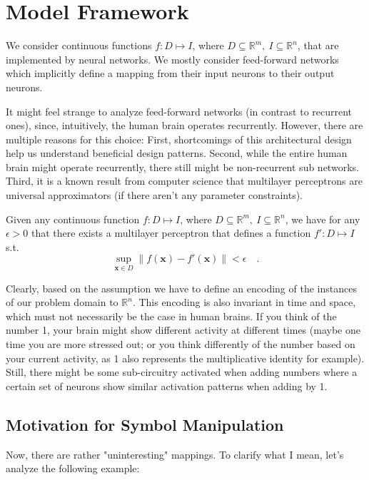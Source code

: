 \documentclass[../../main.tex]{subfiles}
\begin{document}
    \section{Model Framework}
    We consider continuous functions $f: D \mapsto I$, where $D \subseteq \mathbb{R}^m , \ I \subseteq \mathbb{R}^n$, that are implemented by neural networks. We mostly consider feed-forward networks which implicitly define a mapping from their input neurons to their output neurons.

    It might feel strange to analyze feed-forward networks (in contrast to recurrent ones), since, intuitively, the human brain operates recurrently. However, there are multiple reasons for this choice: First, shortcomings of this architectural design help us understand beneficial design patterns. Second, while the entire human brain might operate recurrently, there still might be non-recurrent sub networks. Third, it is a known result from computer science that multilayer perceptrons are universal approximators (if there aren't any parameter constraints).

    \begin{theorem}
        Given any continuous function $f: D \mapsto I$, where $D \subseteq \mathbb{R}^m , \ I \subseteq \mathbb{R}^n$, we have for any $\epsilon > 0$ that there exists a multilayer perceptron that defines a function $f': D \mapsto I$ s.t. 
        \[
            \underset{\bm{x} \in D}{\sup} \|f(\bm{x}) - f'(\bm{x})\| < \epsilon \quad .
        \]
    \end{theorem}

    Clearly, based on the assumption we have to define an encoding of the instances of our problem domain to $\mathbb{R}^n$. This encoding is also invariant in time and space, which must not necessarily be the case in human brains. If you think of the number 1, your brain might show different activity at different times (maybe one time you are more stressed out; or you think differently of the number based on your current activity, as 1 also represents the multiplicative identity for example). Still, there might be some sub-circuitry activated when adding numbers where a certain set of neurons show similar activation patterns when adding by 1.

    \subsection{Motivation for Symbol Manipulation}
    Now, there are rather "uninteresting" mappings. To clarify what I mean, let's analyze the following example:
    
\end{document}

